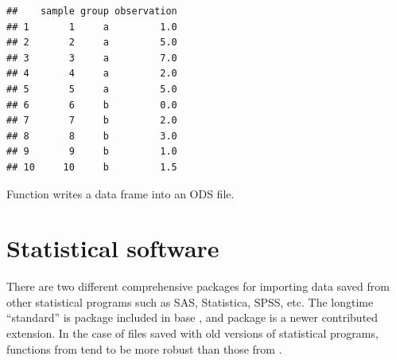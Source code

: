 \documentclass[krantz2]{krantz}\usepackage{knitr}
\begin{document}
\begin{knitrout}\footnotesize
{}\color{fgcolor}\begin{kframe}
\begin{alltt}
 \hlkwb{<-} \hlstd{(}\hlstd{,}  \hlstd{=} \hlstd{)}
\end{alltt}
\end{kframe}
\end{knitrout}

\begin{knitrout}\footnotesize
{}\color{fgcolor}\begin{kframe}
\begin{alltt}
\end{alltt}
\begin{verbatim}
##    sample group observation
## 1       1     a         1.0
## 2       2     a         5.0
## 3       3     a         7.0
## 4       4     a         2.0
## 5       5     a         5.0
## 6       6     b         0.0
## 7       7     b         2.0
## 8       8     b         3.0
## 9       9     b         1.0
## 10     10     b         1.5
\end{verbatim}
\end{kframe}
\end{knitrout}

Function  writes a data frame into an ODS file.

\section{Statistical software}\label{sec:files:stat}

There are two different comprehensive packages for importing data saved from other statistical programs such as SAS, Statistica, SPSS, etc. The longtime ``standard'' is package  included in base \Rlang, and package  is a newer contributed extension. In the case of files saved with old versions of statistical programs, functions from  tend to be more robust than those from .

\subsection[foreign]{}
\end{document}
